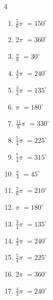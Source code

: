 \begin{multicols}{4}
\begin{enumerate}
  \item $\displaystyle \frac{5}{6}\pi$
        $\displaystyle =150^{\circ}$

\columnbreak %

  \item $\displaystyle 2\pi$
        $\displaystyle =360^{\circ}$

  \item $\displaystyle \frac{\pi}{6}$
        $\displaystyle =30^{\circ}$

  \item $\displaystyle \frac{4}{3}\pi$
        $\displaystyle =240^{\circ}$

  \item $\displaystyle \frac{3}{4}\pi$
        $\displaystyle =135^{\circ}$

  \item $\displaystyle \pi$
        $\displaystyle =180^{\circ}$

  \item $\displaystyle \frac{11}{6}\pi$
        $\displaystyle =330^{\circ}$

  \item $\displaystyle \frac{5}{4}\pi$
        $\displaystyle =225^{\circ}$

  \item $\displaystyle \frac{7}{4}\pi$
        $\displaystyle =315^{\circ}$

  \item $\displaystyle \frac{\pi}{4}$
        $\displaystyle =45^{\circ}$

  \item $\displaystyle \frac{7}{6}\pi$
        $\displaystyle =210^{\circ}$

  \item $\displaystyle \pi$
        $\displaystyle =180^{\circ}$

  \item $\displaystyle \frac{3}{4}\pi$
        $\displaystyle =135^{\circ}$

  \item $\displaystyle \frac{4}{3}\pi$
        $\displaystyle =240^{\circ}$

  \item $\displaystyle \frac{5}{4}\pi$
        $\displaystyle =225^{\circ}$

  \item $\displaystyle 2\pi$
        $\displaystyle =360^{\circ}$

  \item $\displaystyle \frac{4}{3}\pi$
        $\displaystyle =240^{\circ}$


\end{enumerate}
\end{multicols}
